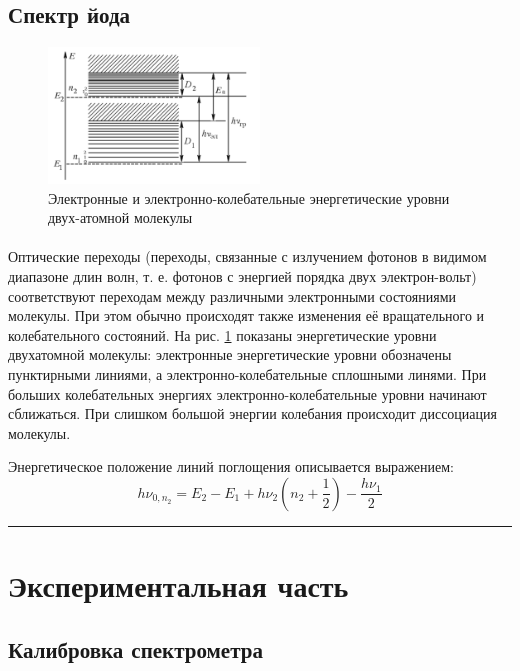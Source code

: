 \documentclass[a4paper,12pt]{article} %
\begin{document}
\subsection{Спектр йода}

\begin{figure}[h]
\centering
\includegraphics[width=0.5\textwidth]{molecular_energy.png}
\caption{Электронные и электронно-колебательные энергетические уровни двух-атомной молекулы}
\label{fig:molecule_en}
\end{figure}

\paragraph{} Оптические переходы (переходы, связанные с излучением фотонов в видимом диапазоне длин волн, т. е. фотонов с энергией порядка двух электрон-вольт) соответствуют переходам между различными электронными состояниями молекулы. При этом обычно происходят также изменения её вращательного и колебательного состояний. На рис. \ref{fig:molecule_en} показаны энергетические уровни двухатомной молекулы: электронные энергетические уровни обозначены пунктирными линиями, а электронно-колебательные сплошными линями. При больших колебательных энергиях электронно-колебательные уровни начинают сближаться. При слишком большой энергии колебания происходит диссоциация молекулы.

Энергетическое положение линий поглощения описывается выражением:
\begin{equation}
h \nu_{0, n_2} = E_2 - E_1 + h \nu_2 \left( n_2 + \frac{1}{2} \right) - \frac{h\nu_1}{2}
\label{e:molecule}
\end{equation}

\medskip\hrule\medskip

\section{Экспериментальная часть}

\subsection{Калибровка спектрометра}
\end{document}
